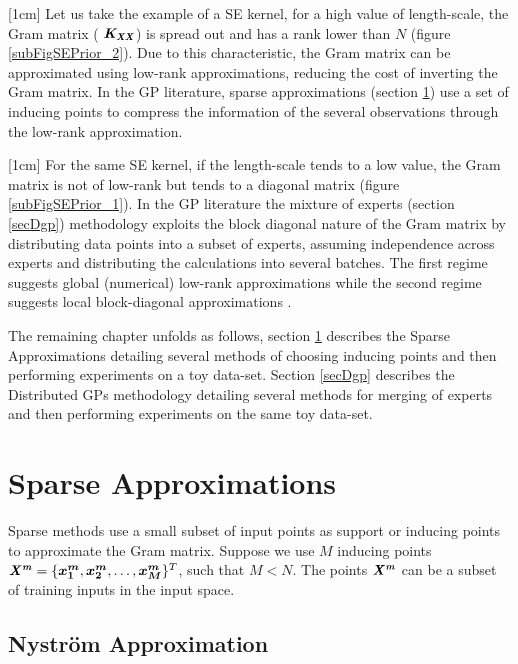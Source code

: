 [1cm]
Let us take the example of a SE kernel, for a high value of length-scale, the Gram matrix ( $\bm{\mathit{K_{XX}}}$) is spread out and has a rank lower than  $N$ (figure \ref{subFigSEPrior_2}). Due to this characteristic, the Gram matrix can be approximated using low-rank approximations, reducing the cost of inverting the Gram matrix. In the GP literature, sparse approximations (section \ref{secSparseApprox}) use a set of inducing points to compress the information of the several observations through the low-rank approximation. 

[1cm]
For the same SE kernel, if the length-scale tends to a low value, the Gram matrix is not of low-rank but tends to a diagonal matrix (figure \ref{subFigSEPrior_1}). In the GP literature the mixture of experts (section \ref{secDgp}) methodology exploits the block diagonal nature of the Gram matrix by distributing data points into a subset of experts, assuming independence across experts and distributing the calculations into several batches. The first regime suggests global (numerical) low-rank approximations while the second regime suggests local block-diagonal approximations \cite{march2015askit, chenhan2016inv}. 

The remaining chapter unfolds as follows, section \ref{secSparseApprox} describes the Sparse Approximations detailing several methods of choosing inducing points and then performing experiments on a toy data-set. Section \ref{secDgp} describes the Distributed GPs methodology detailing several methods for merging of experts and then performing experiments on the same toy data-set. 

\section{Sparse Approximations}\label{secSparseApprox}
Sparse methods use a small subset of input points as support or inducing points to approximate the Gram matrix. Suppose we use $M$ inducing points $\bm{\mathit{X^{m}}} = \{\boldsymbol{x^{m}_{1}}, \boldsymbol{x^{m}_{2}}, \ldots, \boldsymbol{x^{m}_{M}}\}^T$, such that $M < N$. The points $\bm{\mathit{X^{m}}}$ can be a subset of training inputs in the input space. 


\subsection{Nystr\"{o}m Approximation}\label{subSecNystrom} 

